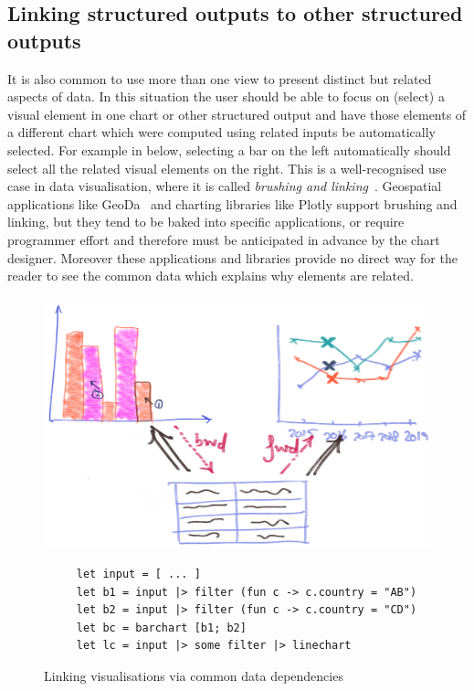 \subsection{Linking structured outputs to other structured outputs}

 It is also common to use more than one view to present distinct but related aspects of data. In this situation the user should be able to focus on (select) a visual element in one chart or other structured output and have those elements of a different chart which were computed using related inputs be automatically selected. For example in  below, selecting a bar on the left automatically should select all the related visual elements on the right. This is a well-recognised use case in data visualisation, where it is called \emph{brushing and linking}~\cite{becker87}. Geospatial applications like GeoDa~\cite{anselin06} and charting libraries like Plotly support brushing and linking, but they tend to be baked into specific applications, or require programmer effort and therefore must be anticipated in advance by the chart designer. Moreover these applications and libraries provide no direct way for the reader to see the common data which explains why elements are related.

\begin{figure}[H]
   {\includegraphics[scale=0.14]{fig/example/vis-linking.png}}
   \small
   \begin{lstlisting}
     let input = [ ... ]
     let b1 = input |> filter (fun c -> c.country = "AB")
     let b2 = input |> filter (fun c -> c.country = "CD")
     let bc = barchart [b1; b2]
     let lc = input |> some filter |> linechart
   \end{lstlisting}
   \caption{Linking visualisations via common data dependencies}
   \label{fig:introduction:vis-linking}
\end{figure}

